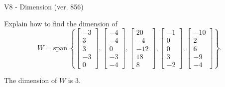 \begin{exercise}
  \begin{exerciseTitle}V8 - Dimension (ver. 856)\end{exerciseTitle}
  \begin{exerciseStatement}
    Explain how to find the dimension of 
\[W=\mathrm{span}\ \left\{\left[\begin{array}{r}
-3 \\
3 \\
3 \\
-3 \\
0
\end{array}\right] , \left[\begin{array}{r}
-4 \\
-4 \\
0 \\
-3 \\
-4
\end{array}\right] , \left[\begin{array}{r}
20 \\
-4 \\
-12 \\
18 \\
8
\end{array}\right] , \left[\begin{array}{r}
-1 \\
0 \\
0 \\
3 \\
-2
\end{array}\right] , \left[\begin{array}{r}
-10 \\
2 \\
6 \\
-9 \\
-4
\end{array}\right]\right\}.\]



  \end{exerciseStatement}
  \begin{exerciseAnswer}
   The dimension of \(W\) is  \(3\).
  


  \end{exerciseAnswer}
\end{exercise}
